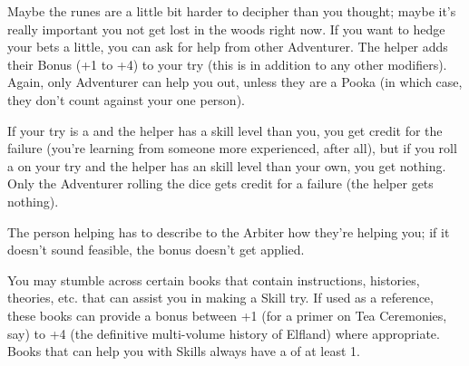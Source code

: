 \begin{multicols*}{2}

  Maybe the runes are a little bit harder to decipher than you thought; maybe it's really important you not get lost in the woods right now.  If you want to hedge your bets a little, you can ask for help from  other Adventurer.  The helper adds their Bonus (+1 to +4) to your try (this is in addition to any other modifiers).  Again, only  Adventurer can help you out, unless they are a Pooka (in which case, they don't count against your one person).


  If your try is a  and the helper has a  skill level than you, you get credit for the failure (you're learning from someone more experienced, after all), but if you roll a  on your try and the helper has an  skill level than your own, you get nothing. Only the Adventurer rolling the dice gets credit for a failure (the helper gets nothing).


  The person helping has to describe to the Arbiter how they're helping you; if it doesn't sound feasible, the bonus doesn't get applied.



   You may stumble across certain books that contain instructions, histories, theories, etc. that can assist you in making a Skill try.  If used as a reference, these books can provide a bonus between +1 (for a primer on Tea Ceremonies, say) to +4 (the definitive multi-volume history of Elfland) where appropriate. Books that can help you with Skills always have a  of at least 1.


\end{multicols*}
